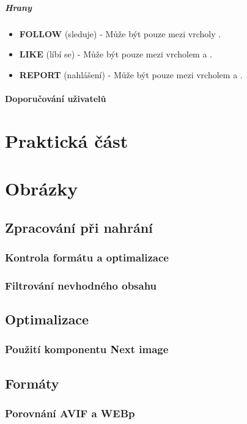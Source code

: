 \documentclass[12pt, a4paper,
 twoside,        %
 openright
]{report}
\begin{document}
            \paragraph{Hrany}
                \begin{itemize}
    	            \item \textbf{FOLLOW} (sleduje) - Může být pouze mezi vrcholy .
    	            \item \textbf{LIKE} (líbí se) - Může být pouze mezi vrcholem  a .
    	            \item \textbf{REPORT} (nahlášení) - Může být pouze mezi vrcholem  a .
                \end{itemize}
        \subsubsection{Doporučování uživatelů}

\chapter{Praktická část}


\chapter{Obrázky}
\section{Zpracování při nahrání}
\subsection{Kontrola formátu a optimalizace}
\subsection{Filtrování nevhodného obsahu}
\section{Optimalizace}
\subsection{Použití komponentu Next image}
\section{Formáty}
\subsection{Porovnání AVIF a WEBp}
\end{document}
